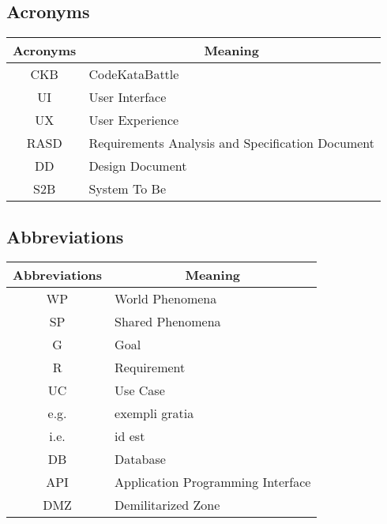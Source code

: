 \subsection{Acronyms}
\begin{table}[H]
    \centering
    \begin{tabular}{|c|l|}
    \hline
    \rowcolor[HTML]{B8C8D5} 
    \textbf{Acronyms} & \multicolumn{1}{c|}{\cellcolor[HTML]{B8C8D5}\textbf{Meaning}} \\ \hline
    CKB & CodeKataBattle  \\ \hline
    UI & User Interface  \\ \hline
    UX & User Experience  \\ \hline
    RASD & Requirements Analysis and Specification Document  \\ \hline
    DD & Design Document  \\ \hline
    S2B & System To Be \\ \hline
    \end{tabular}
\end{table}

\subsection{Abbreviations}
\begin{table}[H]
    \centering
    \begin{tabular}{|c|l|}
    \hline
    \rowcolor[HTML]{B8C8D5} 
    \textbf{Abbreviations} & \multicolumn{1}{c|}{\cellcolor[HTML]{B8C8D5}\textbf{Meaning}} \\ \hline
    WP & World Phenomena  \\ \hline
    SP & Shared Phenomena \\ \hline
    G  & Goal             \\ \hline
    R  & Requirement             \\ \hline
    UC  & Use Case             \\ \hline
    e.g. & exempli gratia \\ \hline
    i.e. & id est \\ \hline
    DB & Database \\ \hline
    API & Application Programming Interface \\ \hline
    DMZ & Demilitarized Zone \\ \hline
    \end{tabular}
\end{table}


